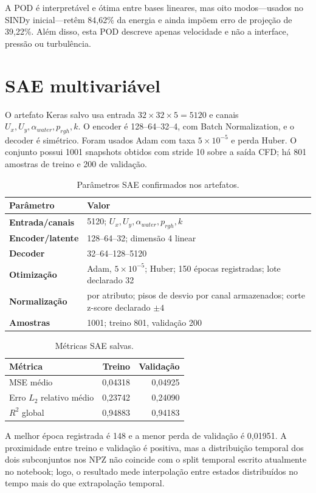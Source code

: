 \documentclass[12pt,a4paper]{article}
\begin{document}
A POD é interpretável e ótima entre bases lineares, mas oito modos---usados no SINDy inicial---retêm 84,62\% da energia e ainda impõem erro de projeção de 39,22\%. Além disso, esta POD descreve apenas velocidade e não a interface, pressão ou turbulência.

\section{SAE multivariável}
O artefato Keras salvo usa entrada $32\times32\times5=5120$ e canais $U_x,U_y,\alpha_{water},p_{rgh},k$. O encoder é 128--64--32--4, com Batch Normalization, e o decoder é simétrico. Foram usados Adam com taxa $5\times10^{-5}$ e perda Huber. O conjunto possui 1001 snapshots obtidos com stride 10 sobre a saída CFD; há 801 amostras de treino e 200 de validação.

\begin{table}[H]\centering
\caption{Parâmetros SAE confirmados nos artefatos.}\label{tab:saeparam}
\begin{tabularx}{\textwidth}{>{\bfseries}l X}
\toprule Parâmetro & Valor\\\midrule
Entrada/canais & 5120; $U_x,U_y,\alpha_{water},p_{rgh},k$\\
Encoder/latente & 128--64--32; dimensão 4 linear\\
Decoder & 32--64--128--5120\\
Otimização & Adam, $5\times10^{-5}$; Huber; 150 épocas registradas; lote declarado 32\\
Normalização & por atributo; pisos de desvio por canal armazenados; corte z-score declarado $\pm4$\\
Amostras & 1001; treino 801, validação 200\\
\bottomrule\end{tabularx}\end{table}

\begin{table}[H]\centering
\caption{Métricas SAE salvas.}\label{tab:saeres}
\begin{tabular}{lrr}\toprule Métrica & Treino & Validação\\\midrule
MSE médio &0,04318&0,04925\\Erro $L_2$ relativo médio&0,23742&0,24090\\$R^2$ global&0,94883&0,94183\\\bottomrule\end{tabular}\end{table}
A melhor época registrada é 148 e a menor perda de validação é 0,01951. A proximidade entre treino e validação é positiva, mas a distribuição temporal dos dois subconjuntos nos NPZ não coincide com o split temporal escrito atualmente no notebook; logo, o resultado mede interpolação entre estados distribuídos no tempo mais do que extrapolação temporal.
\end{document}
